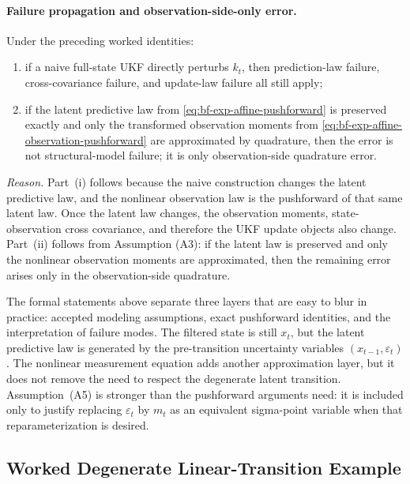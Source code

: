 \paragraph{Failure propagation and observation-side-only error.}
\label{prop:bf-exp-affine-law-mismatch-propagation}
Under the preceding worked identities:
\begin{enumerate}[label=(\roman*)]
  \item if a naive full-state UKF directly perturbs $k_t$, then
    prediction-law failure, cross-covariance failure, and update-law failure all
    still apply;
  \item if the latent predictive law from
    \eqref{eq:bf-exp-affine-pushforward} is preserved exactly and only the
    transformed observation moments from
    \eqref{eq:bf-exp-affine-observation-pushforward} are approximated by
    quadrature, then the error is not structural-model failure; it is only
    observation-side quadrature error.
\end{enumerate}

\emph{Reason.}
Part~(i) follows because the naive construction changes the latent predictive
law, and the nonlinear observation law is the pushforward of that same latent
law.  Once the latent law changes, the observation moments, state-observation
cross covariance, and therefore the UKF update objects also change.  Part~(ii)
follows from Assumption (A3): if the latent law is preserved and only the
nonlinear observation moments are approximated, then the remaining error arises
only in the observation-side quadrature.

The formal statements above separate three layers that are easy to blur in
practice: accepted modeling assumptions, exact pushforward identities, and the
interpretation of failure modes.  The filtered state is still $x_t$, but the
latent predictive law is generated by the pre-transition uncertainty variables
$(x_{t-1},\varepsilon_t)$.  The nonlinear measurement equation adds another
approximation layer, but it does not remove the need to respect the degenerate
latent transition.  Assumption~(A5) is stronger than the pushforward arguments
need: it is included only to justify replacing $\varepsilon_t$ by $m_t$ as an
equivalent sigma-point variable when that reparameterization is desired.

\subsection{Worked Degenerate Linear-Transition Example}
\label{sec:bf-exp-affine-example}

